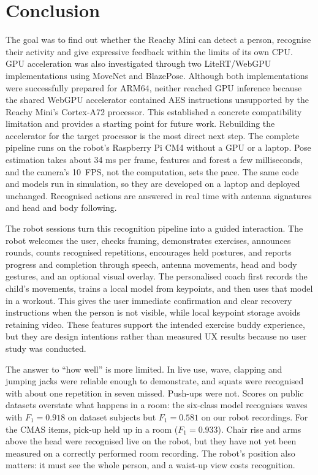 \section{Conclusion}
The goal was to find out whether the Reachy Mini can detect a person,
recognise their activity and give expressive feedback within the limits
of its own CPU. GPU acceleration was also investigated through two LiteRT/WebGPU implementations using MoveNet and BlazePose. Although both implementations were successfully prepared for ARM64, neither reached GPU inference because the shared WebGPU accelerator contained AES instructions unsupported by the Reachy Mini's Cortex-A72 processor. This established a concrete compatibility limitation and provides a starting point for future work. Rebuilding the accelerator for the target processor is the most direct next step.
The complete pipeline runs on the robot's Raspberry Pi CM4
without a GPU or a laptop. Pose estimation takes about 34 ms per
frame, features and forest a few milliseconds, and the camera's 10~FPS,
not the computation, sets the pace. The same code and models run in
simulation, so they are developed on a laptop and deployed unchanged.
Recognised actions are answered in real time with antenna signatures and
head and body following. \newline

The robot sessions turn this recognition pipeline into a guided interaction.
The robot welcomes the user, checks framing, demonstrates exercises, announces
rounds, counts recognised repetitions, encourages held postures, and reports
progress and completion through speech, antenna movements, head and body
gestures, and an optional visual overlay. The personalised coach first records
the child's movements, trains a local model from keypoints, and then uses that
model in a workout. This gives the user immediate confirmation and clear
recovery instructions when the person is not visible, while local keypoint
storage avoids retaining video. These features support the intended exercise
buddy experience, but they are design intentions rather than measured UX
results because no user study was conducted. \newline

The answer to ``how well'' is more limited. In live use, wave, clapping
and jumping jacks were reliable enough to demonstrate, and squats were
recognised with about one repetition in seven missed. Push-ups were not.
Scores on public datasets overstate what happens in a room: the
six-class model recognises waves with $F_1 = 0.918$ on dataset subjects
but $F_1 = 0.581$ on our robot recordings. For the CMAS items, pick-up
held up in a room ($F_1 = 0.933$). Chair rise and arms above the head
were recognised live on the robot, but they have not yet been measured
on a correctly performed room recording. The robot's position also
matters: it must see the whole person, and a waist-up view costs
recognition. \newline

